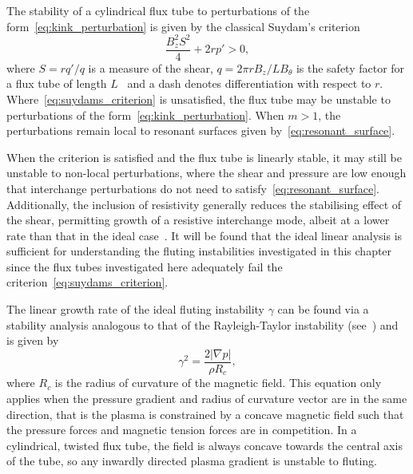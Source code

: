 The stability of a cylindrical flux tube to perturbations of the form~\eqref{eq:kink_perturbation} is given by the classical Suydam's criterion
\begin{equation}
  \label{eq:suydams_criterion}
\frac{B_z^2 S^2}{4} + 2 r p' > 0,
\end{equation}
where $S = r q'/q$ is a measure of the shear, $q = 2\pi r B_z / L B_{\theta}$ is the safety factor for a flux tube of length $L$~\cite{mikhailovskiiInstabilitiesConfinedPlasma1998} and a dash denotes differentiation with respect to $r$. Where~\eqref{eq:suydams_criterion} is unsatisfied, the flux tube may be unstable to perturbations of the form~\eqref{eq:kink_perturbation}. When $m>1$, the perturbations remain local to resonant surfaces given by~\eqref{eq:resonant_surface}.

When the criterion is satisfied and the flux tube is linearly stable, it may still be unstable to non-local perturbations, where the shear and pressure are low enough that interchange perturbations do not need to satisfy~\eqref{eq:resonant_surface}. Additionally, the inclusion of resistivity generally reduces the stabilising effect of the shear, permitting growth of a resistive interchange mode, albeit at a lower rate than that in the ideal case~\cite{mikhailovskiiInstabilitiesConfinedPlasma1998}. It will be found that the ideal linear analysis is sufficient for understanding the fluting instabilities investigated in this chapter since the flux tubes investigated here adequately fail the criterion~\eqref{eq:suydams_criterion}.

The linear growth rate of the ideal fluting instability $\gamma$ can be found via a stability analysis analogous to that of the Rayleigh-Taylor instability (see~\cite{goldstonIntroductionPlasmaPhysics2020}) and is given by
\begin{equation}
  \label{eq:fluting_growth_rate}
\gamma^2 = \frac{2|\nabla p|}{\rho R_c},
\end{equation}
where $R_c$ is the radius of curvature of the magnetic field. This equation only applies when the pressure gradient and radius of curvature vector are in the same direction, that is the plasma is constrained by a concave magnetic field such that the pressure forces and magnetic tension forces are in competition. In a cylindrical, twisted flux tube, the field is always concave towards the central axis of the tube, so any inwardly directed plasma gradient is unstable to fluting.

